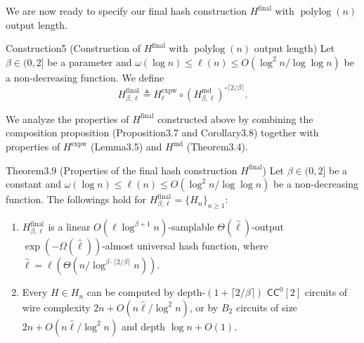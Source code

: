 We are now ready to specify our final hash construction $H^{\mathrm{final}}$ with $\operatorname{polylog}(n)$ output length.
\begin{authorclaim}{Construction5 (Construction of $H^{\mathrm{final}}$ with $\operatorname{polylog}(n)$ output length)}
Let $\beta\in(0,2]$ be a parameter and $\omega(\log n)\le\ell(n)\le O(\log^2n/\log\log n)$ be a non-decreasing function. We define
\[H^{\mathrm{final}}_{\beta,\ell}\triangleq H^{\mathrm{expw}}_\ell\circ(H^{\mathrm{md}}_{\beta,\ell})^{\circ\lceil2/\beta\rceil}.\]
\end{authorclaim}
We analyze the properties of $H^{\mathrm{final}}$ constructed above by combining the composition proposition (Proposition3.7 and Corollary3.8) together with properties of $H^{\mathrm{expw}}$ (Lemma3.5) and $H^{\mathrm{md}}$ (Theorem3.4).
\begin{authorclaim}{Theorem3.9 (Properties of the final hash construction $H^{\mathrm{final}}$)}
Let $\beta\in(0,2]$ be a constant and $\omega(\log n)\le\ell(n)\le O(\log^2n/\log\log n)$ be a non-decreasing function. The followings hold for $H^{\mathrm{final}}_{\beta,\ell}=\{H_n\}_{n\ge1}$:
\begin{enumerate}
\item $H^{\mathrm{final}}_{\beta,\ell}$ is a linear $O(\ell\log^{\beta+1}n)$-samplable $\Theta(\hat\ell)$-output $\exp(-\Omega(\hat\ell))$-almost universal hash function, where $\hat\ell=\ell(\Theta(n/\log^{\beta\cdot\lceil2/\beta\rceil}n))$.
\item Every $H\in H_n$ can be computed by depth-$(1+\lceil2/\beta\rceil)$ $\mathsf{CC}^0[2]$ circuits of wire complexity $2n+O(n\hat\ell/\log^2n)$, or by $B_2$ circuits of size $2n+O(n\hat\ell/\log^2n)$ and depth $\log n+O(1)$.
\end{enumerate}
\end{authorclaim}
